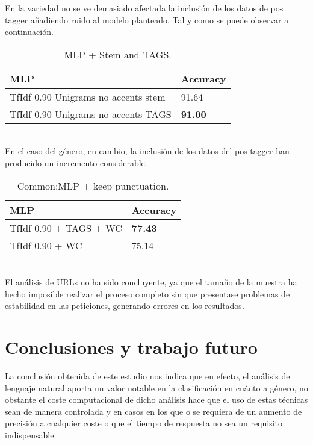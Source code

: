 \documentclass[11pt,a4paper]{article}
\begin{document}
En la variedad no se ve demasiado afectada la inclusión de los datos de pos tagger añadiendo ruido al modelo planteado. Tal y como se puede observar a continuación.
\\
\begin{table}[htbp]
\begin{center}
\begin{tabular}{|l|l|}
\hline
MLP & Accuracy \\
\hline \hline
TfIdf 0.90 Unigrams no accents stem & 91.64 \\ \hline
TfIdf 0.90 Unigrams no accents TAGS & \textbf{91.00} \\ \hline
\end{tabular}
\caption{MLP + Stem and TAGS.}
\label{tabla:sencilla}
\end{center}
\end{table}
\\
En el caso del género, en cambio, la inclusión de los datos del pos tagger han producido un incremento considerable.
\\
\begin{table}[htbp]
\begin{center}
\begin{tabular}{|l|l|}
\hline
MLP & Accuracy \\
\hline \hline
TfIdf 0.90 + TAGS + WC & \textbf{77.43} \\ \hline
TfIdf 0.90 + WC & 75.14 \\ \hline
\end{tabular}
\caption{Common:MLP + keep punctuation.}
\label{tabla:sencilla}
\end{center}
\end{table}
\\
El análisis de URLs no ha sido concluyente, ya que el tamaño de la muestra ha hecho imposible realizar el proceso completo sin que presentase problemas de estabilidad en las peticiones, generando errores en los resultados.

\section{Conclusiones y trabajo futuro}

La conclusión obtenida de este estudio nos indica que en efecto, el análisis de lenguaje natural aporta un valor notable en la clasificación en cuánto a género, no obstante el coste computacional de dicho análisis hace que el uso de estas técnicas sean de manera controlada y en casos en los que o se requiera de un aumento de precisión a cualquier coste o que el tiempo de respuesta no sea un requisito indispensable.
\end{document}
